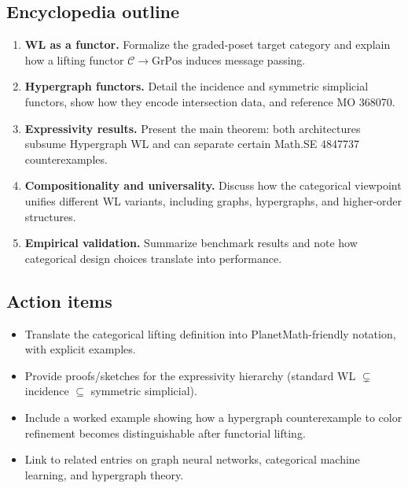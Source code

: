 \subsection*{Encyclopedia outline}
\begin{enumerate}
  \item \textbf{WL as a functor.} Formalize the graded-poset target category and explain how a lifting functor $\mathcal{C}\to \text{GrPos}$ induces message passing.
  \item \textbf{Hypergraph functors.} Detail the incidence and symmetric simplicial functors, show how they encode intersection data, and reference MO 368070.
  \item \textbf{Expressivity results.} Present the main theorem: both architectures subsume Hypergraph WL and can separate certain Math.SE 4847737 counterexamples.
  \item \textbf{Compositionality and universality.} Discuss how the categorical viewpoint unifies different WL variants, including graphs, hypergraphs, and higher-order structures.
  \item \textbf{Empirical validation.} Summarize benchmark results and note how categorical design choices translate into performance.
\end{enumerate}
\subsection*{Action items}
\begin{itemize}
  \item Translate the categorical lifting definition into PlanetMath-friendly notation, with explicit examples.
  \item Provide proofs/sketches for the expressivity hierarchy (standard WL $\subsetneq$ incidence $\subseteq$ symmetric simplicial).
  \item Include a worked example showing how a hypergraph counterexample to color refinement becomes distinguishable after functorial lifting.
  \item Link to related entries on graph neural networks, categorical machine learning, and hypergraph theory.
\end{itemize}
